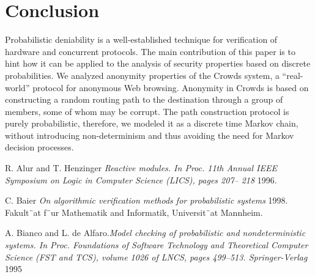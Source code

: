 \documentclass{article}
\begin{document}
\section{Conclusion}
Probabilistic deniability is a well-established technique for verification of hardware and concurrent protocols. The main contribution of this paper is to hint how it can be applied to the analysis of security properties based on discrete probabilities. We analyzed anonymity properties of the Crowds system, a “real-world” protocol for anonymous Web browsing. Anonymity in Crowds is based on constructing a random routing path to the destination through a group of members, some of whom may be corrupt. The path construction protocol is purely probabilistic, therefore, we modeled it as a discrete time Markov chain, without introducing non-determinism and thus avoiding the need for Markov decision processes.
 \begin{thebibliography}{1}

 R. Alur and T. Henzinger {\em Reactive modules. In Proc. 11th Annual
IEEE Symposium on Logic in Computer Science (LICS), pages 207–
218} 1996.

  C. Baier {\em On algorithmic verification methods for probabilistic
systems} 1998. Fakult¨at f¨ur Mathematik and Informatik,
Universit¨at Mannheim.

\bibitem A. Bianco and L. de Alfaro.{\em Model checking of probabilistic and
nondeterministic systems. In Proc. Foundations of Software Technology
and Theoretical Computer Science (FST and TCS), volume 1026 of
LNCS, pages 499–513. Springer-Verlag} 1995
  \end{thebibliography}
\end{document}
